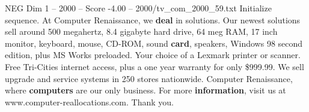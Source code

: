 \begin{textsample}{NEG Dim 1 – 2000 – Score -4.00 – 2000/tv\_com\_2000\_59.txt}  \label{ex:f1_neg_021}
Initialize sequence.
At Computer Renaissance, we \textbf{deal} in solutions.
Our newest solutions sell around 500 megahertz, 8.4 gigabyte hard drive, 64 meg RAM, 17 inch monitor, keyboard, mouse, CD-ROM, sound \textbf{card}, speakers, Windows 98 second edition, plus MS Works preloaded.
Your choice of a Lexmark printer or scanner.
Free Tri-Cities internet access, plus a one year warranty for only \$999.99.
We sell upgrade and service systems in 250 stores nationwide.
Computer Renaissance, where \textbf{computers} are our only business.
For more \textbf{information}, visit us at www.computer-reallocations.com.
Thank you.

\end{textsample}
